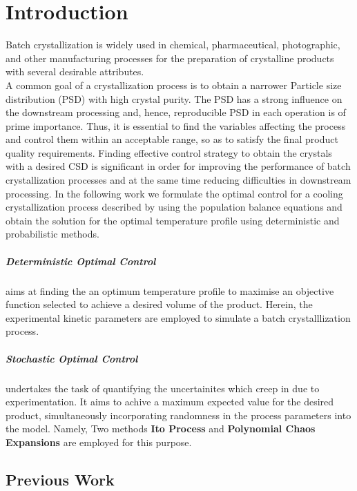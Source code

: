 \chapter{Introduction}
Batch crystallization is widely used in chemical, pharmaceutical, photographic, and other manufacturing processes for the preparation of crystalline products with several desirable attributes. \\
A common goal of a crystallization process is to obtain a narrower Particle size distribution (PSD) with high crystal purity. The PSD has a strong influence on the downstream processing and, hence, reproducible PSD in each operation is of prime importance. Thus, it is essential to find the variables affecting the process and control them within an acceptable range, so as to satisfy the final product quality requirements.
Finding effective control strategy to obtain the crystals with a desired CSD is significant in order for improving the performance of batch crystallization processes and at the same time reducing difficulties in downstream processing.
In the following work we formulate the optimal control for a cooling crystallization process described by using the population balance equations and obtain the solution for the optimal temperature profile using deterministic and probabilistic methods. 

\paragraph{Deterministic Optimal Control} aims at finding the an optimum temperature profile to maximise an objective function selected to achieve a desired volume of the product. Herein, the experimental kinetic parameters are employed to simulate a batch crystalllization process.

\paragraph{Stochastic Optimal Control} undertakes the task of quantifying the uncertainites which creep in due to experimentation. It aims to achive a maximum expected value for the desired product, simultaneously incorporating  randomness in the process parameters into the model. Namely, Two methods \textbf{Ito Process} and \textbf{Polynomial Chaos Expansions} are employed for this purpose.\\

\section{Previous Work}

